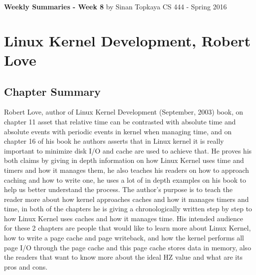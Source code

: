 \documentclass[letterpaper,10pt,draftclsnofoot,onecolumn]{IEEEtran}
\begin{document}
\begin{titlepage}
	
	\begin{center}
	\bigbreak
	\textbf{Weekly Summaries - Week 8}
	\bigbreak
	by Sinan Topkaya
	\smallbreak
	CS 444 - Spring 2016
	\end{center}
\end{titlepage}
	
\section*{Linux Kernel Development, Robert Love}
\subsection*{Chapter Summary}

Robert Love, author of Linux Kernel Development (September, 2003) book, on chapter 11 asset that relative time can be contrasted with absolute time and absolute events with periodic events in kernel when managing time, and on chapter 16 of his book he authors asserts that in Linux kernel it is really important to minimize disk I/O and cache are used to achieve that. He proves his both claims by giving in depth information on how Linux Kernel uses time and timers and how it manages them, he also teaches his readers on how to approach caching and how to write one, he uses a lot of in depth examples on his book to help us better understand the process. The author’s purpose is to teach the reader more about how kernel approaches caches and how it manages timers and time, in both of the chapters he is giving a chronologically written step by step to how Linux Kernel uses caches and how it manages time. His intended audience for these 2 chapters are people that would like to learn more about Linux Kernel, how to write a page cache and page writeback, and how the kernel performs all page I/O through the page cache and this page cache stores data in memory, also the readers that want to know more about the ideal HZ value and what are its pros and cons.
\end{document}
